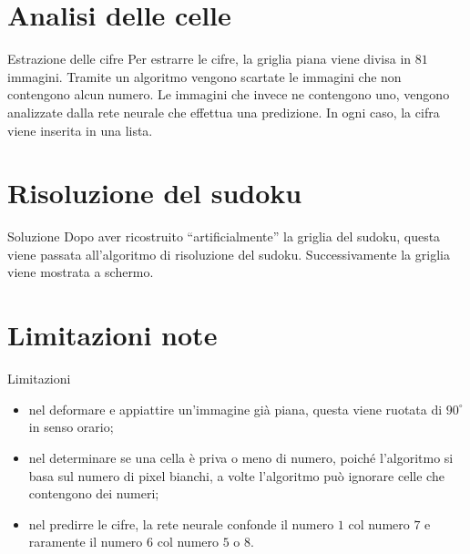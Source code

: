 \documentclass[10pt]{beamer}
\begin{document}
\section{Analisi delle celle}

\begin{frame}[fragile]{Estrazione delle cifre}
    Per estrarre le cifre, la griglia piana viene divisa in \(81\) immagini.
    Tramite un algoritmo vengono scartate le immagini che non contengono alcun numero. Le immagini che invece ne contengono uno, vengono analizzate dalla rete neurale che effettua una predizione. In ogni caso, la cifra viene inserita in una lista.
\end{frame}

\section{Risoluzione del sudoku}

\begin{frame}[fragile]{Soluzione}
    Dopo aver ricostruito ``artificialmente'' la griglia del sudoku, questa
    viene passata all'algoritmo di risoluzione del sudoku.
    Successivamente la griglia viene mostrata a schermo.
\end{frame}

\section{Limitazioni note}

\begin{frame}[fragile]{Limitazioni}
    \begin{itemize}
        \item nel deformare e appiattire un'immagine già piana, questa viene ruotata di \(90^\circ\) in senso orario;
        \item nel determinare se una cella è priva o meno di numero, poiché l'algoritmo si basa sul numero di pixel bianchi, a volte l'algoritmo può ignorare celle che contengono dei numeri;
        \item nel predirre le cifre, la rete neurale confonde il numero \(1\) col numero \(7\) e raramente il numero \(6\) col numero \(5\) o \(8\).
    \end{itemize}
\end{frame}
\end{document}
